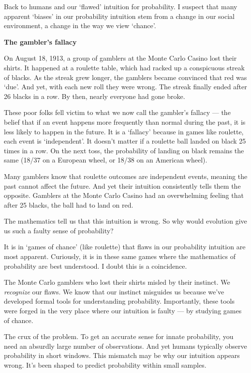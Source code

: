 \documentclass[
]{book}
\begin{document}
Back to humans and our `flawed' intuition for probability. I suspect that many apparent `biases' in our probability intuition stem from a change in our social environment, a change in the way we view `chance'.

\textbf{The gambler's fallacy}

On August 18, 1913, a group of gamblers at the Monte Carlo Casino lost their shirts. It happened at a roulette table, which had racked up a conspicuous streak of blacks. As the streak grew longer, the gamblers became convinced that red was `due'. And yet, with each new roll they were wrong. The streak finally ended after 26 blacks in a row. By then, nearly everyone had gone broke.

These poor folks fell victim to what we now call the gambler's fallacy --- the belief that if an event happens more frequently than normal during the past, it is less likely to happen in the future. It is a `fallacy' because in games like roulette, each event is `independent'. It doesn't matter if a roulette ball landed on black 25 times in a row. On the next toss, the probability of landing on black remains the same (18/37 on a European wheel, or 18/38 on an American wheel).

Many gamblers know that roulette outcomes are independent events, meaning the past cannot affect the future. And yet their intuition consistently tells them the opposite. Gamblers at the Monte Carlo Casino had an overwhelming feeling that after 25 blacks, the ball had to land on red.

The mathematics tell us that this intuition is wrong. So why would evolution give us such a faulty sense of probability?

It is in `games of chance' (like roulette) that flaws in our probability intuition are most apparent. Curiously, it is in these same games where the mathematics of probability are best understood. I doubt this is a coincidence.

The Monte Carlo gamblers who lost their shirts misled by their instinct.
We \emph{recognize} our flaws. We know that our instinct misguides us because we've developed formal tools for understanding probability. Importantly, these tools were forged in the very place where our intuition is faulty --- by studying games of chance.

The crux of the problem. To get an accurate sense for innate probability, you need an absurdly large number of observations. And yet humans typically observe probability in short windows. This mismatch may be why our intuition appears wrong. It's been shaped to predict probability within small samples.
\end{document}
